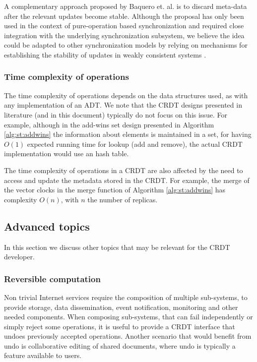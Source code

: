 \documentclass[12pt]{article}
\begin{document}
A complementary approach proposed by Baquero et. al. \cite{Baquero14Making} 
is to discard meta-data after the relevant updates become stable.
Although the proposal has only been used in the context of pure-operation based 
synchronization and required close integration with the underlying synchronization
subsystem, we believe the idea could be adapted to other synchronization models
by relying on mechanisms
for establishing the stability of updates in weakly consistent systems \cite{Golding92Weak}.


\subsubsection{Time complexity of operations}
The time complexity of operations depends on the data structures used, as
with any implementation of an ADT. We note that the CRDT designs presented in
literature (and in this document) typically do not focus on this issue.
For example, although in the add-wins set design presented in 
Algorithm \ref{alg:st:addwins} the information about elements is maintained in a set, 
for having $O(1)$ expected running time for lookup (add and remove), the actual CRDT 
implementation would use an hash table.

The time complexity of operations in a CRDT are also affected by the need to access and
update the metadata stored in the CRDT.
For example, the merge of the vector clocks in the merge function of 
Algorithm \ref{alg:st:addwins} has complexity $O(n)$, with $n$ the number of 
replicas.

\subsection{Advanced topics}

In this section we discuss other topics that may be relevant for the CRDT developer.

\subsubsection{Reversible computation}
Non trivial Internet services require the composition of multiple sub-systems, 
to provide storage, data dissemination, event notification, monitoring and 
other needed components. 
When composing sub-systems, that can fail independently or simply reject some 
operations, it is useful to provide a CRDT interface that undoes 
previously accepted operations. 
Another scenario that would benefit from undo is collaborative editing of 
shared documents, where undo is typically a feature available to users.
\end{document}
